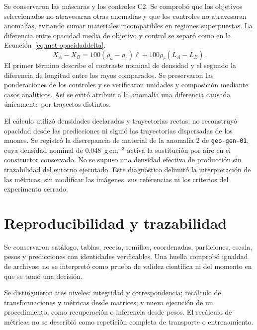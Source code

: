 Se conservaron las máscaras y los controles C2. Se comprobó que los objetivos seleccionados no atravesaran otras anomalías y que los controles no atravesaran anomalías, evitando sumar materiales incompatibles en regiones superpuestas. La diferencia entre opacidad media de objetivo y control se separó como en la Ecuación~\eqref{eq:met-opacidaddelta}.
\begin{equation}\overline X_A-\overline X_B=100(\rho_a-\rho_r)\overline\ell+100\rho_r(\overline L_A-\overline L_B).\label{eq:met-opacidaddelta}\end{equation}
El primer término describe el contraste nominal de densidad y el segundo la diferencia de longitud entre los rayos comparados. Se preservaron las ponderaciones de los controles y se verificaron unidades y composición mediante casos analíticos. Así se evitó atribuir a la anomalía una diferencia causada únicamente por trayectos distintos.

El cálculo utilizó densidades declaradas y trayectorias rectas; no reconstruyó opacidad desde las predicciones ni siguió las trayectorias dispersadas de los muones. Se registró la discrepancia de material de la anomalía 2 de \texttt{geo-gen-01}, cuya densidad nominal de 0,048~g\,cm$^{-3}$ activa la sustitución por aire en el constructor conservado. No se supuso una densidad efectiva de producción sin trazabilidad del entorno ejecutado. Este diagnóstico delimitó la interpretación de las métricas, sin modificar las imágenes, sus referencias ni los criterios del experimento cerrado.


\section{Reproducibilidad y trazabilidad}\label{sec:met-reproducibilidad}
Se conservaron catálogo, tablas, receta, semillas, coordenadas, particiones, escala, pesos y predicciones con identidades verificables. Una huella comprobó igualdad de archivos; no se interpretó como prueba de validez científica ni del momento en que se tomó una decisión.

Se distinguieron tres niveles: integridad y correspondencia; recálculo de transformaciones y métricas desde matrices; y nueva ejecución de un procedimiento, como recuperación o inferencia desde pesos. El recálculo de métricas no se describió como repetición completa de transporte o entrenamiento.

